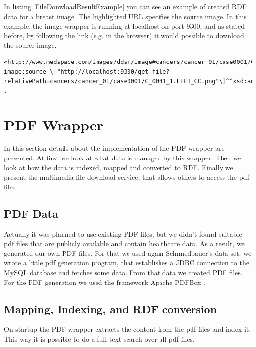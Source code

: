 In listing \ref{FileDonwloadResultExample} you can see an example of created RDF data for a breast image. The highlighted URL specifies the source image. In this example, the image wrapper is running at localhost on port 9300, and as stated before, by following the link (e.g. in the browser) it would possible to download the source image.

\begin{lstlisting}[style=RdfCodeStyle, caption=image RDF conversion example, label=FileDonwloadResultExample]
<http://www.medspace.com/images/ddsm/image#cancers/cancer_01/case0001/C_0001_1.LEFT_CC.png>
image:source \["http://localhost:9300/get-file?relativePath=cancers/cancer_01/case0001/C_0001_1.LEFT_CC.png"\]^^xsd:anyURI .
\end{lstlisting}



\section{PDF Wrapper}
In this section details about the implementation of the PDF wrapper are presented.
At first we look at what data is managed by this wrapper. Then we look at how the data is indexed, mapped and converted to RDF. Finally we present the multimedia file download service, that allows others to access the pdf files.

\subsection{PDF Data}

Actually it was planned to use existing PDF files, but we didn't found suitable pdf files that are publicly available and contain healthcare data. As a result, we generated our own PDF files. For that we used again Schmiedbauer's data set: we wrote a little pdf generation program, that establishes a JDBC connection to the MySQL database and fetches some data. From that data we created PDF files. For the PDF generation we used the framework Apache PDFBox \cite{PDFBox}.  

\subsection{Mapping, Indexing, and RDF conversion}

On startup the PDF wrapper extracts the content from the pdf files and index it. This way it is possible to do a full-text search over all pdf files. 

